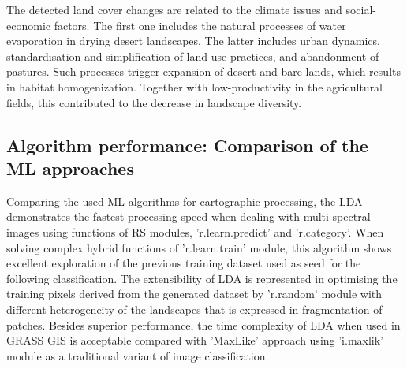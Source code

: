 \documentclass[sn-mathphys-num]{sn-jnl}%
\theoremstyle{thmstyleone}%
\theoremstyle{thmstyletwo}%
\theoremstyle{thmstylethree}%
\begin{document}
{The detected land cover changes are related to the climate issues and social-economic factors. The first one includes the natural processes of water evaporation in drying desert landscapes. The latter includes urban dynamics, standardisation and simplification of land use practices, and abandonment of pastures. Such processes trigger expansion of desert and bare lands, which results in habitat homogenization. Together with low-productivity in the agricultural fields, this contributed to the decrease in landscape diversity.}

\subsection{Algorithm performance: Comparison of the ML approaches}

Comparing the used ML algorithms for cartographic processing, the LDA demonstrates the fastest processing speed when dealing with multi-spectral images using functions of RS modules, 'r.learn.predict' and 'r.category'. When solving complex hybrid functions of 'r.learn.train' module, this algorithm shows excellent exploration of the previous training dataset used as seed for the following classification. The extensibility of LDA is represented in optimising the training pixels derived from the generated dataset by 'r.random' module with different heterogeneity of the landscapes that is expressed in fragmentation of patches. Besides superior performance, the time complexity of LDA when used in GRASS GIS is acceptable compared with 'MaxLike' approach using 'i.maxlik' module as a traditional variant of image classification.
\end{document}
